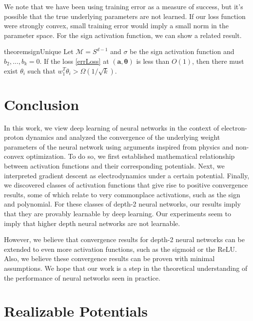\documentclass{article}
\begin{document}
We note that we have been using training error as a measure of success, but it's possible that the true underlying parameters are not learned. If our loss function were strongly convex, small training error would imply a small norm in the parameter space. For the sign activation function, we can show a related result.

\begin{restatable}{theorem}{signUnique}
\label{SignUnique}
Let $\mathcal{M} = S^{d-1}$ and $\sigma$ be the sign activation function and $b_2,...,b_k = 0$. If the loss \eqref{errLoss} at $(\boldsymbol{a,\theta})$ is less than $O(1)$, then there must exist $\theta_i$ such that $w_1^T\theta_i > \Omega(1/\sqrt{k})$.
\end{restatable}



\section{Conclusion}

In this work, we view deep learning of neural networks in the context of electron-proton dynamics and analyzed the convergence of the underlying weight parameters of the neural network using arguments inspired from physics and non-convex optimization. To do so, we first established mathematical relationship between activation functions and their corresponding potentials. Next, we interpreted gradient descent as electrodynamics under a certain potential. Finally, we discovered classes of activation functions that give rise to positive convergence results, some of which relate to very commonplace activations, such as the sign and polynomial. For these classes of depth-2 neural networks, our results imply that they are provably learnable by deep learning. Our experiments seem to imply that higher depth neural networks are not learnable. 

However, we believe that convergence results for depth-2 neural networks can be extended to even more activation functions, such as the sigmoid or the ReLU. Also, we believe these convergence results can be proven with minimal assumptions. We hope that our work is a step in the theoretical understanding of the performance of neural networks seen in practice.







\newpage
\appendix


\section{Realizable Potentials}
\label{realizable}
\end{document}
